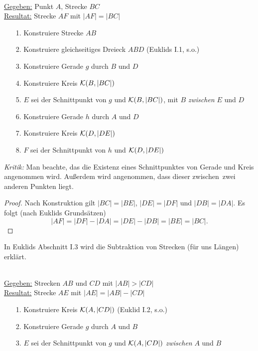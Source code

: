 \begin{konst}
\phantom{Pups}\hspace*{1cm}\phantom{Pups}\\
\underline{Gegeben:} Punkt $A$, Strecke $BC$ \\ 
\underline{Resultat:} Strecke $AF$ mit $|AF|=|BC|$
\begin{enumerate}
\item[1.] Konstruiere Strecke $AB$
\item[2.] Konstruiere gleichseitiges Dreieck $ABD$ (Euklids I.1, s.o.)
\item[3.] Konstruiere Gerade $g$ durch $B$ und $D$
\item[4.] Konstruiere Kreis ${\mathcal K}(B,|BC|)$ 
\item[5.] $E$ sei der Schnittpunkt von $g$ und ${\mathcal K}(B,|BC|)$, mit $B$
  {\em zwischen} $E$ und $D$
\item[6.] Konstruiere Gerade $h$ durch $A$ und $D$
\item[7.] Konstruiere Kreis ${\mathcal K}(D,|DE|)$ 
\item[8.] $F$ sei der Schnittpunkt von $h$ und ${\mathcal K}(D,|DE|)$
\end{enumerate}
\end{konst}

{\em Kritik:}
Man beachte, 
das die Existenz eines Schnittpunktes von Gerade und Kreis angenommen wird.
Außerdem wird angenommen, dass dieser \glqq zwischen\grqq\ zwei
anderen Punkten liegt.

\begin{proof}
Nach Konstruktion gilt $|BC|=|BE|$, $|DE|=|DF|$ und $|DB|=|DA|$.
Es folgt (nach Euklids \glqq Grundsätzen\grqq )
$$
|AF|=|DF|-|DA|= |DE|-|DB| = |BE| = |BC|.
$$
\end{proof}



In Euklids Abschnitt I.3 wird die Subtraktion von Strecken (für uns
Längen) erklärt. 

\begin{konst}
\phantom{Pups}\hspace*{1cm}\phantom{Pups}\\
\underline{Gegeben:} Strecken $AB$ und $CD$ mit  $|AB| > |CD|$ \\ 
\underline{Resultat:} Strecke $AE$ mit $|AE|=|AB|-|CD|$ 
\begin{enumerate}
\item[1.] Konstruiere Kreis ${\mathcal K}(A,|CD|)$ (Euklid I.2, s.o.)
\item[2.] Konstruiere Gerade $g$ durch $A$ und $B$
\item[3.] $E$ sei der Schnittpunkt von $g$ und ${\mathcal K}(A,|CD|)$  {\em zwischen} $A$ und $B$
\end{enumerate}
\end{konst}




